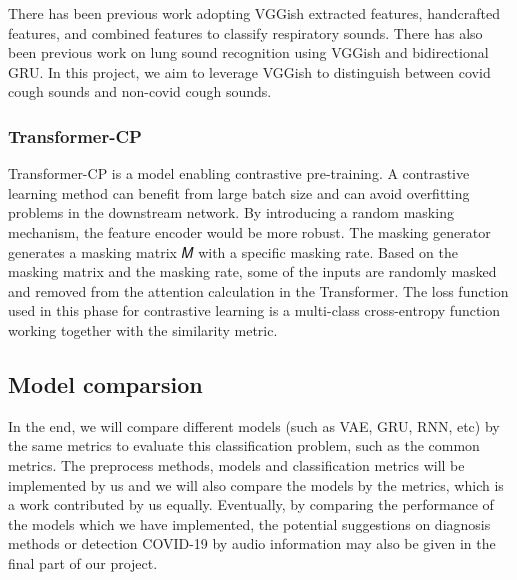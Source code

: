 \documentclass[11pt]{article}
\begin{document}
\noindent
There has been previous work adopting VGGish extracted features, handcrafted features, and combined
 features to classify respiratory sounds\cite{Chao1st}. There has also been previous work on lung sound
 recognition using VGGish and bidirectional GRU\cite{Chao5th}. In this project, we aim to leverage VGGish to
 distinguish between covid cough sounds and non-covid cough sounds.

\subsubsection{Transformer-CP}
Transformer-CP is a model enabling contrastive pre-training. A contrastive learning method can
benefit from large batch size and can avoid overfitting problems in the downstream network. By
introducing a random masking mechanism, the feature encoder would be more robust. The masking
generator generates a masking matrix 𝑀 with a specific masking rate. Based on the masking matrix
and the masking rate, some of the inputs are randomly masked and removed from the attention calculation
in the Transformer. The loss function used in this phase for contrastive learning is a multi-class
cross-entropy function working together with the similarity metric.\\


\subsection{Model comparsion}
\noindent
In the end, we will compare different models (such as VAE, GRU, RNN, etc) by the same metrics to evaluate this classification
problem, such as the common metrics\cite{hossin2015review}. The preprocess methods, models and classification metrics will be
implemented by us and we will also compare the models by the metrics, which is a work contributed by us equally.
Eventually, by comparing the performance of the models which
 we have implemented, the potential suggestions on diagnosis methods or detection COVID-19 by audio
 information may also be given in the final part of our project.



\newpage

\end{document}
